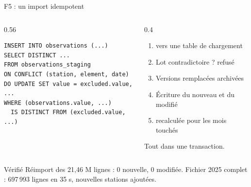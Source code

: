 \documentclass[aspectratio=169]{pres}
\begin{document}
\begin{frame}[fragile]{F5 : un import idempotent}
  \begin{columns}[T]
    \begin{column}{0.56\textwidth}
\begin{lstlisting}[style=sql]
INSERT INTO observations (...)
SELECT DISTINCT ...
FROM observations_staging
ON CONFLICT (station, element, date)
DO UPDATE SET value = excluded.value, ...
WHERE (observations.value, ...)
  IS DISTINCT FROM (excluded.value, ...)
\end{lstlisting}
    \end{column}
    \begin{column}{0.4\textwidth}
      \small
      \begin{enumerate}
        \item {} vers une table de chargement
        \item Lot contradictoire ? refusé
        \item Versions remplacées archivées
        \item Écriture du nouveau et du modifié
        \item {} recalculée pour les mois touchés
      \end{enumerate}
      Tout dans une transaction.
    \end{column}
  \end{columns}
  \begin{block}{Vérifié}
    Réimport des 21,46 M lignes : 0 nouvelle, 0 modifiée. Fichier 2025 complet : 697\,993 lignes en 35 s, nouvelles stations ajoutées.
  \end{block}
\end{frame}
\end{document}
